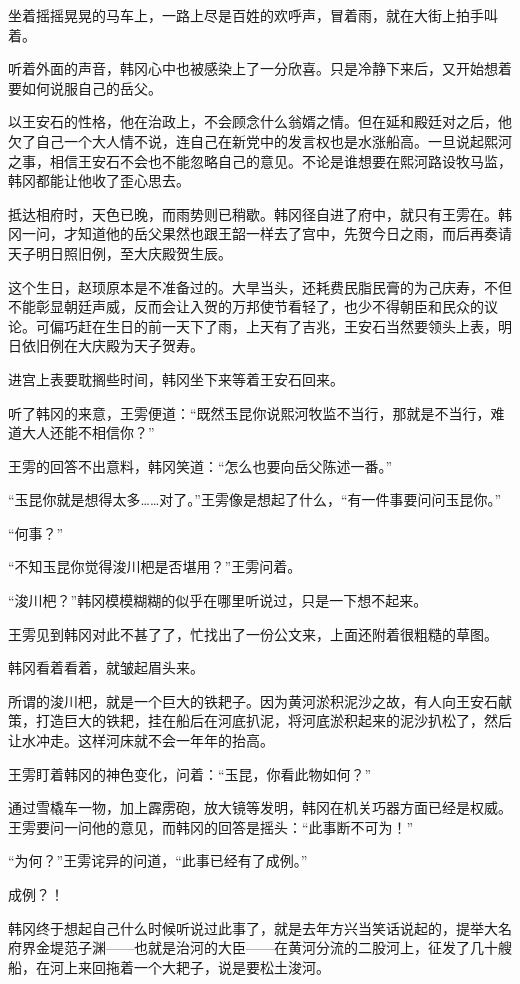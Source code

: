 坐着摇摇晃晃的马车上，一路上尽是百姓的欢呼声，冒着雨，就在大街上拍手叫着。

听着外面的声音，韩冈心中也被感染上了一分欣喜。只是冷静下来后，又开始想着要如何说服自己的岳父。

以王安石的性格，他在治政上，不会顾念什么翁婿之情。但在延和殿廷对之后，他欠了自己一个大人情不说，连自己在新党中的发言权也是水涨船高。一旦说起熙河之事，相信王安石不会也不能忽略自己的意见。不论是谁想要在熙河路设牧马监，韩冈都能让他收了歪心思去。

抵达相府时，天色已晚，而雨势则已稍歇。韩冈径自进了府中，就只有王雱在。韩冈一问，才知道他的岳父果然也跟王韶一样去了宫中，先贺今日之雨，而后再奏请天子明日照旧例，至大庆殿贺生辰。

这个生日，赵顼原本是不准备过的。大旱当头，还耗费民脂民膏的为己庆寿，不但不能彰显朝廷声威，反而会让入贺的万邦使节看轻了，也少不得朝臣和民众的议论。可偏巧赶在生日的前一天下了雨，上天有了吉兆，王安石当然要领头上表，明日依旧例在大庆殿为天子贺寿。

进宫上表要耽搁些时间，韩冈坐下来等着王安石回来。

听了韩冈的来意，王雱便道：“既然玉昆你说熙河牧监不当行，那就是不当行，难道大人还能不相信你？”

王雱的回答不出意料，韩冈笑道：“怎么也要向岳父陈述一番。”

“玉昆你就是想得太多……对了。”王雱像是想起了什么，“有一件事要问问玉昆你。”

“何事？”

“不知玉昆你觉得浚川杷是否堪用？”王雱问着。

“浚川杷？”韩冈模模糊糊的似乎在哪里听说过，只是一下想不起来。

王雱见到韩冈对此不甚了了，忙找出了一份公文来，上面还附着很粗糙的草图。

韩冈看着看着，就皱起眉头来。

所谓的浚川杷，就是一个巨大的铁耙子。因为黄河淤积泥沙之故，有人向王安石献策，打造巨大的铁耙，挂在船后在河底扒泥，将河底淤积起来的泥沙扒松了，然后让水冲走。这样河床就不会一年年的抬高。

王雱盯着韩冈的神色变化，问着：“玉昆，你看此物如何？”

通过雪橇车一物，加上霹雳砲，放大镜等发明，韩冈在机关巧器方面已经是权威。王雱要问一问他的意见，而韩冈的回答是摇头：“此事断不可为！”

“为何？”王雱诧异的问道，“此事已经有了成例。”

成例？！

韩冈终于想起自己什么时候听说过此事了，就是去年方兴当笑话说起的，提举大名府界金堤范子渊——也就是治河的大臣——在黄河分流的二股河上，征发了几十艘船，在河上来回拖着一个大耙子，说是要松土浚河。

